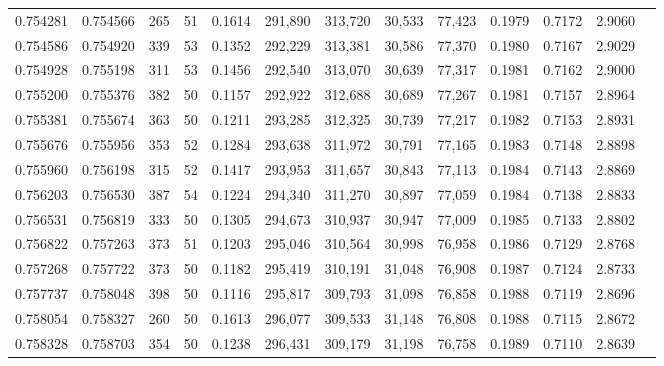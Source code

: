 \begin{tabular}{rrrrrrrrrrrrr}
0.754281 & 0.754566 &   265 &  51 &                                     0.1614 & 291,890 & 313,720 &  30,533 &  77,423 & 0.1979 & 0.7172 & 2.9060 \\
0.754586 & 0.754920 &   339 &  53 &                                     0.1352 & 292,229 & 313,381 &  30,586 &  77,370 & 0.1980 & 0.7167 & 2.9029 \\
0.754928 & 0.755198 &   311 &  53 &                                     0.1456 & 292,540 & 313,070 &  30,639 &  77,317 & 0.1981 & 0.7162 & 2.9000 \\
0.755200 & 0.755376 &   382 &  50 &                                     0.1157 & 292,922 & 312,688 &  30,689 &  77,267 & 0.1981 & 0.7157 & 2.8964 \\
0.755381 & 0.755674 &   363 &  50 &                                     0.1211 & 293,285 & 312,325 &  30,739 &  77,217 & 0.1982 & 0.7153 & 2.8931 \\
0.755676 & 0.755956 &   353 &  52 &                                     0.1284 & 293,638 & 311,972 &  30,791 &  77,165 & 0.1983 & 0.7148 & 2.8898 \\
0.755960 & 0.756198 &   315 &  52 &                                     0.1417 & 293,953 & 311,657 &  30,843 &  77,113 & 0.1984 & 0.7143 & 2.8869 \\
0.756203 & 0.756530 &   387 &  54 &                                     0.1224 & 294,340 & 311,270 &  30,897 &  77,059 & 0.1984 & 0.7138 & 2.8833 \\
0.756531 & 0.756819 &   333 &  50 &                                     0.1305 & 294,673 & 310,937 &  30,947 &  77,009 & 0.1985 & 0.7133 & 2.8802 \\
0.756822 & 0.757263 &   373 &  51 &                                     0.1203 & 295,046 & 310,564 &  30,998 &  76,958 & 0.1986 & 0.7129 & 2.8768 \\
0.757268 & 0.757722 &   373 &  50 &                                     0.1182 & 295,419 & 310,191 &  31,048 &  76,908 & 0.1987 & 0.7124 & 2.8733 \\
0.757737 & 0.758048 &   398 &  50 &                                     0.1116 & 295,817 & 309,793 &  31,098 &  76,858 & 0.1988 & 0.7119 & 2.8696 \\
0.758054 & 0.758327 &   260 &  50 &                                     0.1613 & 296,077 & 309,533 &  31,148 &  76,808 & 0.1988 & 0.7115 & 2.8672 \\
0.758328 & 0.758703 &   354 &  50 &                                     0.1238 & 296,431 & 309,179 &  31,198 &  76,758 & 0.1989 & 0.7110 & 2.8639 \\

\end{tabular}

